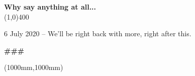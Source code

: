 \documentclass[8pt]{article}
\begin{document}
\begin{center}
\thispagestyle{empty}
	\textbf{Why say anything at all...} \\[0pt]

\line(1,0){400}\\[10pt]
\end{center}


6 July 2020 -- We'll be right back with more, right after this.

\begin{center}
	\textbf{\Large{\#\#\#}} \\
\end{center}

\thispagestyle{empty}
\begin{textblock*}{300mm}(1000mm,1000mm)
\end{textblock*}
\end{document}
